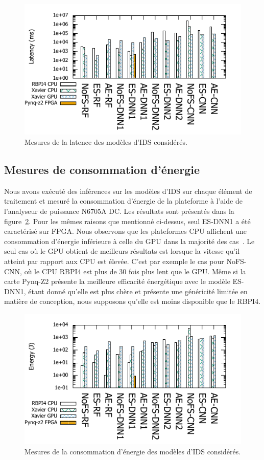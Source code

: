 {\begin{figure}
    \centering
    \includegraphics[width=0.6\columnwidth]{5_Chapitre5/figures/latency_bar.pdf}
    \caption{Mesures de la latence des modèles d'\gls{IDS} considérés.}
    \label{figure:herocache-performance}
\end{figure}

\subsection{Mesures de consommation d'énergie}

Nous avons exécuté des inférences sur les modèles d'\gls{IDS} sur chaque élément de traitement et mesuré la consommation d'énergie de la plateforme à l'aide de l'analyseur de puissance N6705A DC. Les résultats sont présentés dans la figure~\ref{figure:herocache-energy}. Pour les mêmes raisons que mentionné ci-dessus, seul ES-DNN1 a été caractérisé sur \gls{FPGA}. Nous observons que les plateformes \gls{CPU} affichent une consommation d'énergie inférieure à celle du \gls{GPU} dans la majorité des cas~\cite{slimani:hal-04159551, SLIMANI2024}. Le seul cas où le \gls{GPU} obtient de meilleurs résultats est lorsque la vitesse qu'il atteint par rapport aux \gls{CPU} est élevée. C'est par exemple le cas pour NoFS-CNN, où le \gls{CPU} RBPI4 est plus de 30 fois plus lent que le \gls{GPU}. Même si la carte Pynq-Z2 présente la meilleure efficacité énergétique avec le modèle ES-DNN1, étant donné qu'elle est plus chère et présente une généricité limitée en matière de conception, nous supposons qu'elle est moins disponible que le RBPI4.

\begin{figure}
    \centering
    \includegraphics[width=0.6\columnwidth]{5_Chapitre5/figures/energy_bar.pdf}
    \caption{Mesures de la consommation d'énergie des modèles d'\gls{IDS} considérés.}
    \label{figure:herocache-energy}
\end{figure}

}
